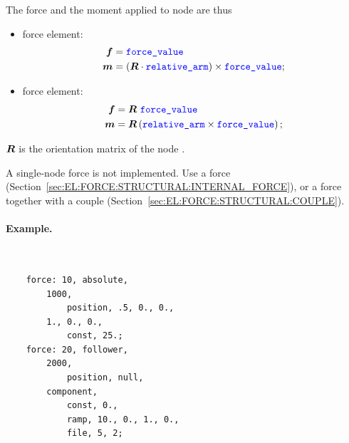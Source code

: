 The force and the moment applied to node  are thus
\begin{itemize}
\item {} force element:
\begin{subequations}
\begin{align}
	\boldsymbol{f} & = \textcolor{blue}{\texttt{force\_value}} \\
	\boldsymbol{m} & = \left( \boldsymbol{R} \cdot \textcolor{blue}{\texttt{relative\_arm}} \right) \times \textcolor{blue}{\texttt{force\_value}} ;
\end{align}
\end{subequations}

\item {} force element:
\begin{subequations}
\begin{align}
	\boldsymbol{f} & = \boldsymbol{R} \ \textcolor{blue}{\texttt{force\_value}} \\
	\boldsymbol{m} & = \boldsymbol{R} \left( \textcolor{blue}{\texttt{relative\_arm}} \times \textcolor{blue}{\texttt{force\_value}} \right) ;
\end{align}
\end{subequations}

\end{itemize}
$\boldsymbol{R}$ is the orientation matrix of the node .

A single-node  force is not implemented. Use a
 force (Section~\ref{sec:EL:FORCE:STRUCTURAL:INTERNAL_FORCE}),
or a  force together with a  couple
(Section~\ref{sec:EL:FORCE:STRUCTURAL:COUPLE}).

\paragraph{Example.} \
\begin{verbatim}
    force: 10, absolute,
        1000,
            position, .5, 0., 0.,
        1., 0., 0.,
            const, 25.;
    force: 20, follower,
        2000,
            position, null,
        component,
            const, 0.,
            ramp, 10., 0., 1., 0.,
            file, 5, 2;
\end{verbatim}
